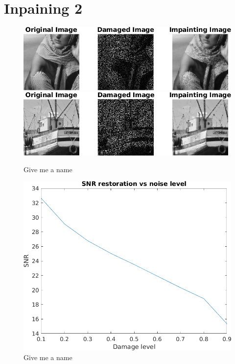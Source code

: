 \documentclass[a4paper,12pt]{article}
\begin{document}
\section{Inpaining 2}
\begin{figure}[t]
        \centering
        \includegraphics{../Results/Inpainting_pdual_barb_evolution.png}
        \includegraphics{../Results/Inpainting_pdual_boat_evolution.png}
        \caption{Give me a name} 
		\label{fig:evolve2}
\end{figure}


\begin{figure}[t]
        \centering
        \includegraphics{../Results/Inpainting_lena_noise_vs_SNR.png}
        \caption{Give me a name} 
		\label{fig:nvssnr}
\end{figure}
\end{document}
